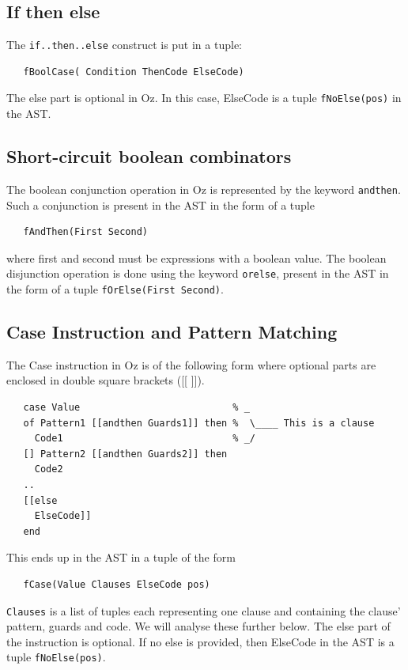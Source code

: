 \documentclass[a4paper]{memoir}
\begin{document}
\subsection{If then else}
The \lstinline!if..then..else! construct is put in a tuple:
\begin{lstlisting}
   fBoolCase( Condition ThenCode ElseCode)
\end{lstlisting}
The else part is optional in Oz. In this case, ElseCode is a tuple \lstinline!fNoElse(pos)! in the AST.

\subsection{Short-circuit boolean combinators}\label{sec:input:booleancombinations}
The boolean conjunction operation in Oz is represented by the keyword \lstinline!andthen!. Such a conjunction is present in the AST in the form of a tuple 
\begin{lstlisting}
   fAndThen(First Second)
\end{lstlisting}
where first and second must be expressions with a boolean value.
The boolean disjunction operation is done using the keyword \lstinline!orelse!, present in the AST in the form of a tuple \lstinline!fOrElse(First Second)!.

\subsection{Case Instruction and Pattern Matching}\label{sec:input:patternmatching}
The Case instruction in Oz is of the following form where optional parts are enclosed in double square brackets ([[ ]]).
\begin{lstlisting}
   case Value                           % _
   of Pattern1 [[andthen Guards1]] then %  \____ This is a clause
     Code1                              % _/
   [] Pattern2 [[andthen Guards2]] then
     Code2
   ..
   [[else
     ElseCode]]
   end
\end{lstlisting}
This ends up in the AST in a tuple of the form 
\begin{lstlisting}
   fCase(Value Clauses ElseCode pos)
\end{lstlisting}
\lstinline!Clauses! is a list of tuples each representing one clause and containing the clause' pattern, guards and code. We will analyse these further below.
The else part of the instruction is optional. If no else is provided, then ElseCode in the AST is a tuple \lstinline!fNoElse(pos)!.
\end{document}
